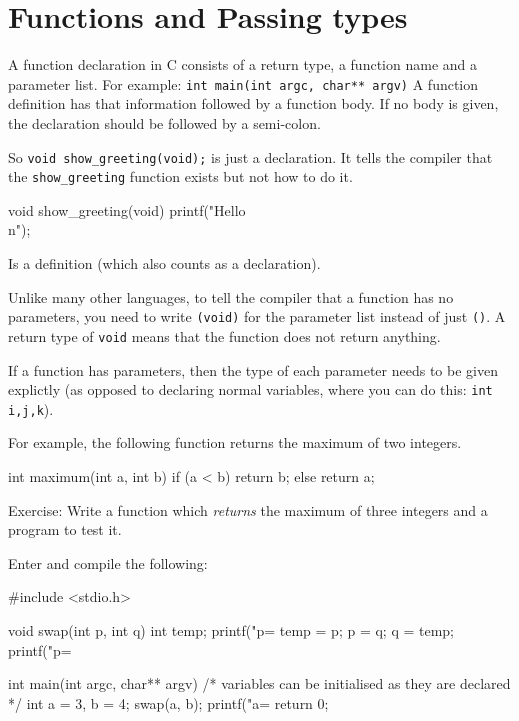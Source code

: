 
\chapter{Functions and Passing types}

A function declaration in C consists of a return type, a function name and a parameter list.
For example:
\lstinline!int main(int argc, char** argv)!
A function definition has that information followed by a function body. 
If no body is given, the declaration should be followed by a semi-colon.

So \lstinline!void show_greeting(void);!  is just a declaration.
It tells the compiler that the \texttt{show\_greeting} function exists but not how to do it.
\begin{lstinline}
void show_greeting(void) {
    printf("Hello\\n");
}
\end{lstinline}
Is a definition (which also counts as a declaration).

Unlike many other languages, to tell the compiler that a function has no parameters, you 
need to write \lstinline!(void)! for the parameter list instead of just \lstinline!()!.
A return type of \lstinline!void! means that the function does not return anything.

If a function has parameters, then the type of each parameter needs to be given explictly (as
opposed to declaring normal variables, where you can do this: \lstinline!int i,j,k!).

For example, the following function returns the maximum of two integers.
\begin{codeblock}
int maximum(int a, int b) {
    if (a < b) {
        return b;
    } else {
        return a;
    }
}
\end{codeblock}

Exercise: Write a function which \emph{returns} the maximum of three integers and a program to test it.

Enter and compile the following:
\begin{codeblock}
#include <stdio.h>

void swap(int p, int q) {
    int temp;
    printf("p=%
    temp = p;
    p = q;
    q = temp;
    printf("p=%
}

int main(int argc, char** argv) {
    /* variables can be initialised as they are declared */
    int a = 3, b = 4;
    swap(a, b);
    printf("a=%
    return 0;
}
\end{codeblock}

